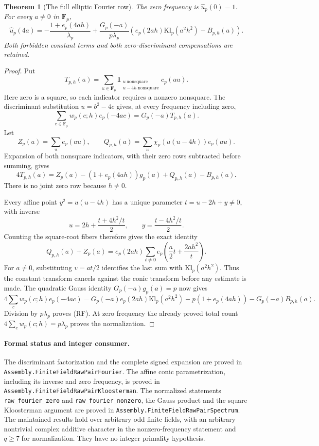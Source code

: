 \documentclass[11pt]{article}
\newtheorem{theorem}{Theorem}[section]
\newcommand{\F}{\mathbf F}
\begin{document}
\begin{theorem}[The full elliptic Fourier row]
\label{thm:rawEllipticFourierRow}
The zero frequency is \(\widehat u_p(0)=1\).
For every \(a\ne0\) in \(\F_p\),
\[
 \widehat u_p(4a)=
 -\frac{1+e_p(4ah)}{\lambda_p}
 +\frac{G_p(-a)}{p\lambda_p}
   \left(e_p(2ah)\mathrm{Kl}_p(a^2h^2)-B_{p,h}(a)\right).
 \tag{RF}
\]
Both forbidden constant terms and both zero-discriminant
compensations are retained.
\end{theorem}
\begin{proof}
Put
\[
 T_{p,h}(a)=\sum_{u\in\F_p}
 \mathbf1_{\substack{u\ \mathrm{nonsquare}\\
                     u-4h\ \mathrm{nonsquare}}}e_p(au).
\]
Here zero is a square, so each indicator requires a nonzero
nonsquare. The discriminant substitution \(u=b^2-4c\) gives,
at every frequency including zero,
\[
 \sum_{c\in\F_p}w_p(c;h)e_p(-4ac)
                  =G_p(-a)T_{p,h}(a).
\]
Let
\[
 Z_p(a)=\sum_u e_p(au),\qquad
 Q_{p,h}(a)=\sum_u\chi_p(u(u-4h))e_p(au).
\]
Expansion of both nonsquare indicators, with their zero rows
subtracted before summing, gives
\[
 4T_{p,h}(a)=Z_p(a)
 -(1+e_p(4ah))g_p(a)+Q_{p,h}(a)-B_{p,h}(a).
\]
There is no joint zero row because \(h\ne0\).

Every affine point \(y^2=u(u-4h)\) has a unique parameter
\(t=u-2h+y\ne0\), with inverse
\[
 u=2h+\frac{t+4h^2/t}{2},\qquad
 y=\frac{t-4h^2/t}{2}.
\]
Counting the square-root fibers therefore gives the exact identity
\[
 Q_{p,h}(a)+Z_p(a)=
 e_p(2ah)\sum_{t\ne0}e_p\!\left(\frac a2t+\frac{2ah^2}{t}\right).
\]
For \(a\ne0\), substituting \(v=at/2\) identifies the last
sum with \(\mathrm{Kl}_p(a^2h^2)\).
Thus the constant transform cancels against the conic transform
before any estimate is made.
The quadratic Gauss identity
\(G_p(-a)g_p(a)=p\) now gives
\[
 4\sum_c w_p(c;h)e_p(-4ac)=
 G_p(-a)e_p(2ah)\mathrm{Kl}_p(a^2h^2)
 -p(1+e_p(4ah))-G_p(-a)B_{p,h}(a).
\]
Division by \(p\lambda_p\) proves (RF).
At zero frequency the already proved total count
\(4\sum_cw_p(c;h)=p\lambda_p\) proves the normalization.
\end{proof}

\paragraph{Formal status and integer consumer.}
The discriminant factorization and the complete signed expansion are
proved in \texttt{Assembly.FiniteFieldRawPairFourier}.
The affine conic parametrization, including its inverse and zero
frequency, is proved in
\texttt{Assembly.FiniteFieldRawPairKloosterman}.
The normalized statements \texttt{raw\_fourier\_zero} and
\texttt{raw\_fourier\_nonzero}, the Gauss product and the square
Kloosterman argument are proved in
\texttt{Assembly.FiniteFieldRawPairSpectrum}.
The maintained results hold over arbitrary odd finite fields,
with an arbitrary nontrivial complex additive character in the
nonzero-frequency statement and \(q\geq7\) for normalization.
They have no integer primality hypothesis.
\end{document}
